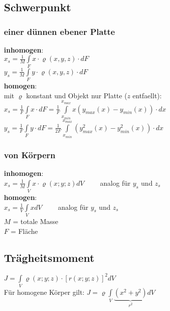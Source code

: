   \begin{multicols}{2}
  \subsection{Schwerpunkt}
    \subsubsection{einer dünnen ebener Platte}
      \textbf{inhomogen}:\\
        $x_s=\frac{1}{M} \int\limits_F x \cdot \varrho(x,y,z)\cdot dF$\\
        $y_s=\frac{1}{M} \int\limits_F y \cdot \varrho(x,y,z)\cdot dF$\\
      \textbf{homogen}:\\
        mit $\varrho$ konstant und Objekt nur Platte ($z$ entfaellt):\\
        $x_s=\frac{1}{F} \int\limits_F x\cdot dF = \frac{1}{F} \int\limits_{x_{min}}^{x_{max}}
        x(y_{max}(x)-y_{min}(x))\cdot dx$ \\
        $y_s=\frac{1}{F} \int\limits_F y\cdot dF = \frac{1}{2F} \int\limits_{x_{min}}^{x_{max}}
        (y_{max}^2(x)-y_{min}^2(x))\cdot dx$ \\
    \columnbreak
    
    \subsubsection{von Körpern}
      \textbf{inhomogen}: \\
        $x_s = \frac{1}{M}\int\limits_V x \cdot \varrho(x;y;z) dV \qquad$ analog für $y_s$ und $z_s$\\
      \textbf{homogen}: \\
        $x_s = \frac{1}{V}\int\limits_V x dV \qquad$ analog für $y_s$ und $z_s$\\
      
      $M$ = totale Masse\\
      $F$ = Fläche
      
      \subsection{Trägheitsmoment}
  $J = \int\limits_V \varrho(x;y;z) \cdot [r(x;y;z)]^2 dV$ \\
  Für homogene Körper gilt: $J = \varrho \int\limits_V \underbrace{(x^2+y^2)}_{r^2}dV$

  \end{multicols}
   


